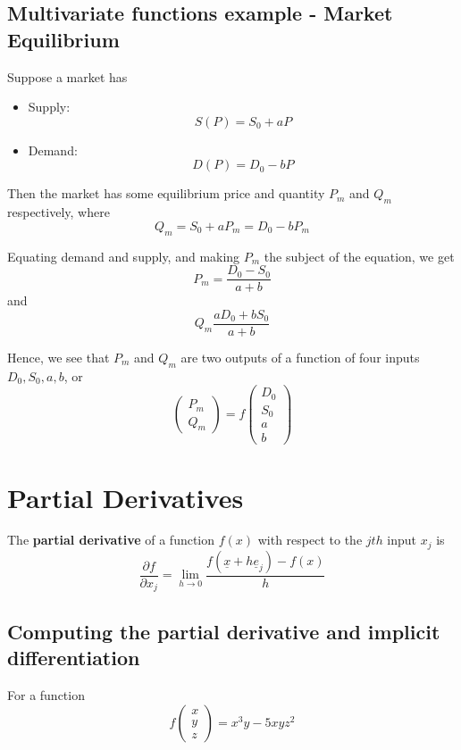 \subsection{Multivariate functions example - Market Equilibrium}

Suppose a market has \begin{itemize}
   \item Supply: \[
     S(P) = S_0 + aP
   \] 
   \item Demand: \[
     D(P) = D_0 - bP
   \] 
\end{itemize}

Then the market has some equilibrium price and quantity $P_m$ and $Q_m$ respectively, where
\[
  Q_m = S_0 + aP_m = D_0 - bP_m
\] 

Equating demand and supply, and making $P_m$ the subject of the equation, we get \[
  P_m = \frac{D_0 - S_0}{a+b}
\] 
and \[
  Q_m \frac{aD_0 + bS_0}{a + b}
\] 

Hence, we see that $P_m$ and $Q_m$ are two outputs of a function of four inputs $D_0, S_0, a, b$, or \[
  \begin{pmatrix} P_m \\ Q_m \end{pmatrix} = f \begin{pmatrix} D_0 \\ S_0 \\ a \\ b \end{pmatrix}
\] 

\section{Partial Derivatives}

\begin{framed}
   The \textbf{partial derivative} of a function $f(x)$ with respect to the $jth$ input $x_j$ is 
   \[
      \frac{\partial f}{\partial x_j} = \lim_{h \to 0} \frac{f( \underline{x} + h \underline{e}_j) - f(x)}{h}
   \] 
\end{framed}

\subsection{Computing the partial derivative and implicit differentiation}

For a function \[
  f \begin{pmatrix} x \\ y \\ z \end{pmatrix} = x ^ 3 y - 5 x y z ^2 
\] 

